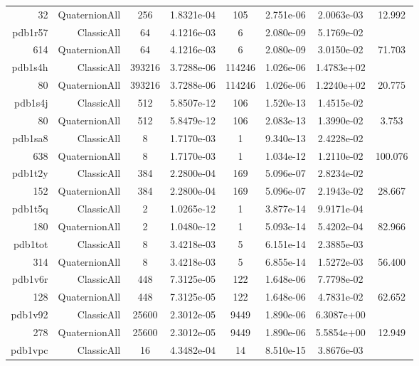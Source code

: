 \begin{xltabular}{\textwidth}{r|rcS[table-format=1.4e+2]cS[table-format=1.3e+2]S[table-format=1.4e+2]S[table-format=-1.3]}
32 & QuaternionAll & 256 & 1.8321e-04 & 105 & 2.751e-06 & 2.0063e-03 & 12.992\\  \addlinespace
pdb1r57 & ClassicAll & 64 & 4.1216e-03 & 6 & 2.080e-09 & 5.1769e-02 & \\
614 & QuaternionAll & 64 & 4.1216e-03 & 6 & 2.080e-09 & 3.0150e-02 & 71.703\\  \addlinespace
pdb1s4h & ClassicAll & 393216 & 3.7288e-06 & 114246 & 1.026e-06 & 1.4783e+02 & \\
80 & QuaternionAll & 393216 & 3.7288e-06 & 114246 & 1.026e-06 & 1.2240e+02 & 20.775\\  \addlinespace
pdb1s4j & ClassicAll & 512 & 5.8507e-12 & 106 & 1.520e-13 & 1.4515e-02 & \\
80 & QuaternionAll & 512 & 5.8479e-12 & 106 & 2.083e-13 & 1.3990e-02 & 3.753\\  \addlinespace
pdb1sa8 & ClassicAll & 8 & 1.7170e-03 & 1 & 9.340e-13 & 2.4228e-02 & \\
638 & QuaternionAll & 8 & 1.7170e-03 & 1 & 1.034e-12 & 1.2110e-02 & 100.076\\  \addlinespace
pdb1t2y & ClassicAll & 384 & 2.2800e-04 & 169 & 5.096e-07 & 2.8234e-02 & \\
152 & QuaternionAll & 384 & 2.2800e-04 & 169 & 5.096e-07 & 2.1943e-02 & 28.667\\  \addlinespace
pdb1t5q & ClassicAll & 2 & 1.0265e-12 & 1 & 3.877e-14 & 9.9171e-04 & \\
180 & QuaternionAll & 2 & 1.0480e-12 & 1 & 5.093e-14 & 5.4202e-04 & 82.966\\  \addlinespace
pdb1tot & ClassicAll & 8 & 3.4218e-03 & 5 & 6.151e-14 & 2.3885e-03 & \\
314 & QuaternionAll & 8 & 3.4218e-03 & 5 & 6.855e-14 & 1.5272e-03 & 56.400\\  \addlinespace
pdb1v6r & ClassicAll & 448 & 7.3125e-05 & 122 & 1.648e-06 & 7.7798e-02 & \\
128 & QuaternionAll & 448 & 7.3125e-05 & 122 & 1.648e-06 & 4.7831e-02 & 62.652\\  \addlinespace
pdb1v92 & ClassicAll & 25600 & 2.3012e-05 & 9449 & 1.890e-06 & 6.3087e+00 & \\
278 & QuaternionAll & 25600 & 2.3012e-05 & 9449 & 1.890e-06 & 5.5854e+00 & 12.949\\  \addlinespace
pdb1vpc & ClassicAll & 16 & 4.3482e-04 & 14 & 8.510e-15 & 3.8676e-03 & \\

\end{xltabular}

